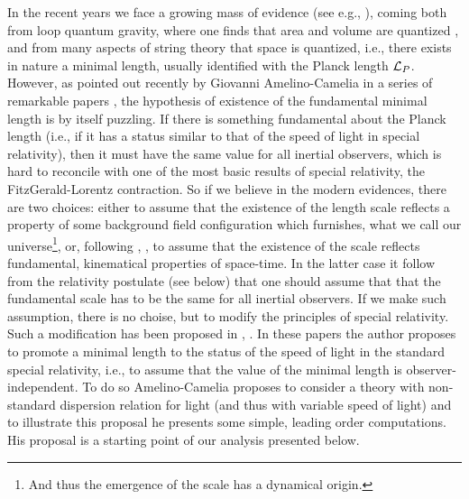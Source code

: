 \documentclass [11pt] {article}
\begin{document}
In the recent years we face a growing mass of evidence (see e.g., 
\cite{gara}), coming both from loop quantum gravity, where one finds that 
area and volume are quantized \cite{rovsmol}, and from many aspects of  
string theory that space is quantized, i.e., there exists in nature a 
minimal length, usually identified with the Planck length ${\cal L}_P$. 
However, as pointed out recently by Giovanni Amelino-Camelia in a series of 
remarkable papers \cite{gac1}, \cite{gac2} the hypothesis of existence of 
the fundamental minimal length is by itself puzzling. If there is something 
fundamental about the Planck length  (i.e., if it has a status similar to 
that of the speed of light in special relativity), then it must have the 
same value for all inertial observers, which is hard to reconcile with one 
of the most basic results of special relativity, the FitzGerald-Lorentz 
contraction. So if we believe in the modern evidences, there are two 
choices: either to assume that the existence of the length scale reflects a 
property of some background field configuration which furnishes, what we 
call our universe\footnote{And thus the emergence of the scale has a 
dynamical origin.}, or, following \cite{gac1}, \cite{gac2}, to assume that 
the existence of the scale reflects  fundamental, kinematical properties of 
space-time. In the latter case it follow from the relativity postulate (see 
below) that one should assume that that the fundamental scale has to be the 
same for all inertial observers. If we make such assumption, there is no 
choise, but to modify the principles of special relativity. Such a 
modification has been proposed in \cite{gac1}, \cite{gac2}.   In these 
papers the author proposes to promote a minimal length to the status of the 
speed of light in the standard special relativity, i.e., to assume that the 
value of the minimal length is observer-independent. To do so 
Amelino-Camelia proposes to consider a theory with non-standard dispersion 
relation for light (and thus with variable speed of light) and to 
illustrate this proposal he presents some simple, leading order 
computations. His proposal is a starting point of our analysis presented 
below. 
\end{document}
